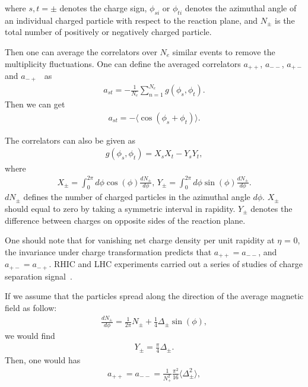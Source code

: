 \documentclass[twocolumn,showpacs,preprintnumbers,amsmath,amssymb]{revtex4}
\begin{document}
\noindent where $s,t=\pm$ denotes the charge sign, $\phi_{si}$ or $\phi_{ti}$
denotes the azimuthal angle of an individual charged particle with respect to the reaction plane, and $N_{\pm}$ is the total number of positively or negatively charged particle.

Then one can average the correlators over $N_{e}$ similar events to remove the multiplicity fluctuations. One can define the averaged
correlators $a_{++}$, $a_{--}$, $a_{+-}$ and $a_{-+}$~\cite{lab7,lab29} as
\begin{eqnarray}
a_{st}=-\frac{1}{N_{e}}\sum_{n=1}^{N_{e}}g(\phi_{s},\phi_{t}).
\label{eq:eq25} %
\end{eqnarray}
Then we can get
\begin{eqnarray}
a_{st} = - \langle \cos(\phi_s + \phi_t) \rangle.
\end{eqnarray}

The correlators can also be given as
\begin{eqnarray}
g(\phi_s, \phi_t) = X_s X_t - Y_s Y_t,
\end{eqnarray}
where
\begin{eqnarray}
X_{\pm} = \int_0^{2\pi} d\phi \cos(\phi) \frac{d N_\pm}{d\phi}, \, Y_{\pm} = \int_0^{2\pi} d\phi \sin(\phi) \frac{dN_\pm}{d\phi}.
\end{eqnarray}
$dN_\pm$ defines the number of charged particles in the azimuthal angle $d\phi$. $X_\pm$ should equal to zero by taking a symmetric interval in rapidity. $Y_\pm$ denotes the difference between charges on opposite sides of the reaction plane.

One should note that for vanishing net charge density per unit rapidity at $\eta$ = 0, the invariance under charge transformation predicts that
$a_{++}=a_{--}$, and $a_{+-}=a_{-+}$. RHIC and LHC experiments carried out a series of studies of charge separation signal~\cite{lab8,lab9,lab10,lab11}.

If we assume that the particles  spread along the direction of the average magnetic field as follow:
\begin{eqnarray}
\frac{dN_{\pm}}{d \phi} = \frac{1}{2\pi} N_{\pm} + \frac{1}{4} \Delta_{\pm} \sin(\phi),
\end{eqnarray}
we would find
\begin{eqnarray}
Y_{\pm} = \frac{\pi}{4} \Delta_{\pm}.
\end{eqnarray}
Then, one would has
\begin{eqnarray}
a_{++}=a_{--}=\frac{1}{N_{+}^{2}} \frac{\pi^2}{16} \langle\Delta_{\pm}^{2}\rangle,
\label{eq:eq28} %
\end{eqnarray}
\end{document}

